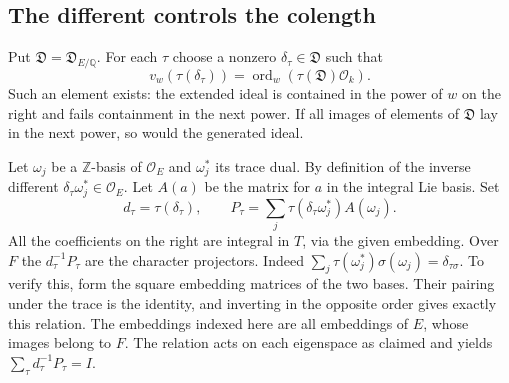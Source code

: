 \subsection{The different controls the colength}

Put \(\mathfrak D=\mathfrak D_{E/\mathbb Q}\).
For each \(\tau\) choose a nonzero
\(\delta_\tau\in\mathfrak D\) such that
\[
    v_w(\tau(\delta_\tau))
      =\operatorname{ord}_w(\tau(\mathfrak D)\mathcal O_k).
\]
Such an element exists: the extended ideal is contained in the
power of \(w\) on the right and fails containment in the next power.
If all images of elements of \(\mathfrak D\) lay in the next power,
so would the generated ideal.

Let \(\omega_j\) be a \(\mathbb Z\)-basis of \(\mathcal O_E\) and
\(\omega_j^*\) its trace dual. By definition of the inverse different
\(\delta_\tau\omega_j^*\in\mathcal O_E\). Let \(A(a)\) be the matrix
for \(a\) in the integral Lie basis. Set
\[
   d_\tau=\tau(\delta_\tau),\qquad
   P_\tau=\sum_j \tau(\delta_\tau\omega_j^*)A(\omega_j).
\]
All the coefficients on the right are integral in \(T\), via the
given embedding. Over \(F\) the \(d_\tau^{-1}P_\tau\) are the
character projectors. Indeed
\(\sum_j\tau(\omega_j^*)\sigma(\omega_j)=\delta_{\tau\sigma}\).
To verify this, form the square embedding matrices of the two
bases. Their pairing under the trace is the identity, and inverting
in the opposite order gives exactly this relation. The embeddings
indexed here are all embeddings of \(E\), whose images belong to
\(F\). The relation acts on each eigenspace as claimed and yields
\(\sum_\tau d_\tau^{-1}P_\tau=I\).

